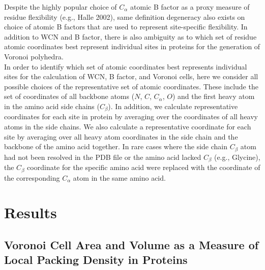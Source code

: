 \documentclass[11pt]{article}
\begin{document}
        Despite the highly popular choice of $C_\alpha$ atomic B factor as a proxy measure of residue flexibility (e.g., Halle 2002), same definition degeneracy also exists on choice of atomic B factors that are used to represent site-specific flexibility. In addition to WCN and B factor, there is also ambiguity as to which set of residue atomic coordinates best represent individual sites in proteins for the generation of Voronoi polyhedra. \\

        In order to identify which set of atomic coordinates best represents individual sites for the calculation of WCN, B factor, and Voronoi cells, here we consider all possible choices of the representative set of atomic coordinates. These include the set of coordinates of all backbone atoms ($N$, $C$, $C_\alpha$, $O$) and the first heavy atom in the amino acid side chains ($C_\beta$). In addition, we calculate representative coordinates for each site in protein by averaging over the coordinates of all heavy atoms in the side chains. We also calculate a representative coordinate for each site by averaging over all heavy atom coordinates in the side chain and the backbone of the amino acid together. In rare cases where the side chain $C_\beta$ atom had not been resolved in the PDB file or the amino acid lacked $C_\beta$ (e.g., Glycine), the $C_\beta$ coordinate for the specific amino acid were replaced with the coordinate of the corresponding $C_\alpha$ atom in the same amino acid. \\


\section{Results}
\label{sec:results}

    \subsection*{Voronoi Cell Area and Volume as a Measure of Local Packing Density in Proteins}
    
\end{document}
